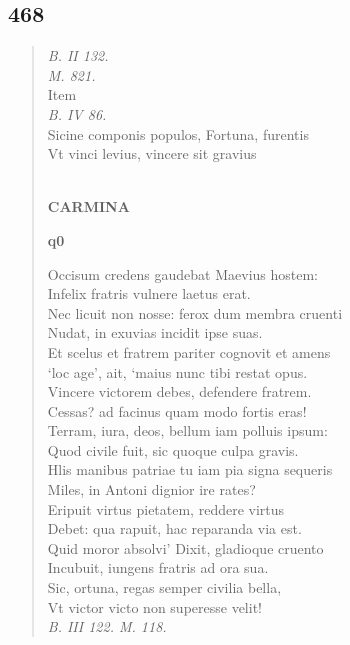 \documentclass[11pt, a4paper]{report}
\begin{document}
            \subsection*{468}
      \begin{verse}
      \textit{B. II 132.} \\ \textit{M. 821.} \\  \lbrack Item \rbrack  \\ \textit{B. IV 86.} \\ Sicine componis populos, Fortuna, furentis \\ Vt vinci levius, vincere sit gravius \\ 
        ﻿\pagebreak 
    \begin{center} \textbf{CARMINA} \end{center}\begin{center} \textbf{q0} \end{center}Occisum credens gaudebat Maevius hostem: \\ Infelix fratris vulnere laetus erat. \\ Nec licuit non nosse: ferox dum membra cruenti \\ Nudat, in exuvias incidit ipse suas. \\ Et scelus et fratrem pariter cognovit et amens \\ ‘loc age’, ait, ‘maius nunc tibi restat opus. \\ Vincere victorem debes, defendere fratrem. \\ Cessas? ad facinus quam modo fortis eras! \\ Terram, iura, deos, bellum iam polluis ipsum: \\ Quod civile fuit, sic quoque culpa gravis. \\ Hlis manibus patriae tu iam pia signa sequeris \\ Miles, in Antoni dignior ire rates? \\ Eripuit virtus pietatem, reddere virtus \\ Debet: qua rapuit, hac reparanda via est. \\ Quid moror absolvi’ Dixit, gladioque cruento \\ Incubuit, iungens fratris ad ora sua. \\ Sic, ortuna, regas semper civilia bella, \\ Vt victor victo non superesse velit! \\ \textit{B. III 122. M. 118.} \\ 
      \end{verse}
  
\end{document}

